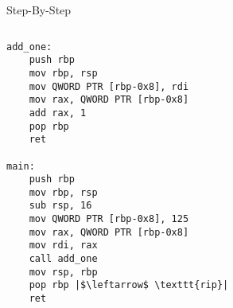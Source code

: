 \documentclass[hyphens,aspectratio=169]{beamer}
\begin{document}
\begin{frame}[fragile]{Step-By-Step}
    \begin{columns}
        \begin{column}{0.33\textwidth}
            \begin{verbatim}
add_one:
    push rbp
    mov rbp, rsp
    mov QWORD PTR [rbp-0x8], rdi
    mov rax, QWORD PTR [rbp-0x8]
    add rax, 1
    pop rbp
    ret

main:
    push rbp
    mov rbp, rsp
    sub rsp, 16
    mov QWORD PTR [rbp-0x8], 125
    mov rax, QWORD PTR [rbp-0x8]
    mov rdi, rax
    call add_one
    mov rsp, rbp
    pop rbp |$\leftarrow$ \texttt{rip}|
    ret
            \end{verbatim}
        \end{column}
        \begin{column}{0.33\textwidth}
\end{column}
\end{columns}
\end{frame}
\end{document}
